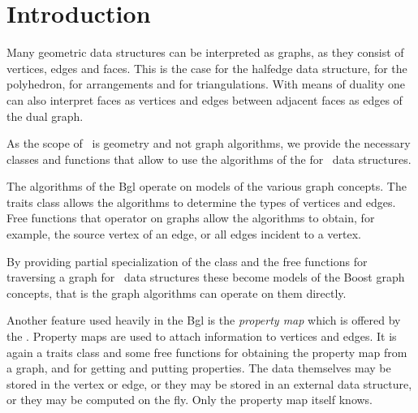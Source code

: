
\section{Introduction}

Many geometric data structures can be interpreted as graphs, as they consist of
vertices, edges and faces. This is the case for the halfedge data structure,
for the polyhedron, for arrangements and for triangulations. With means of
duality one can also interpret faces as vertices and edges between adjacent
faces as edges of the dual graph. 


As the scope of \cgal\ is geometry and not graph algorithms, we
provide the necessary classes and functions that allow to use the
algorithms of the  for \cgal\ data structures.

The algorithms of the {\sc Bgl} operate on models of the various graph concepts. 
The traits class  allows the algorithms to determine the types of vertices and edges. 
Free functions that operator on graphs allow the algorithms to obtain,
for example, the source vertex of an edge, or  all edges incident to a vertex.

By providing partial specialization of the class  and the 
free functions for traversing a graph for \cgal\ data structures these become models of
the Boost graph concepts, that is the graph algorithms can operate on them
directly.

Another feature used heavily in the {\sc Bgl} is the {\em property map}
which is offered by the .
Property maps are used to attach information to vertices and edges. It is again
a traits class and some free functions for obtaining the property map from
a graph, and  for getting and putting properties. The data themselves
may be stored in the vertex or edge, or they may be stored in an external
data structure, or they may be computed on the fly. Only the property
map itself knows.


